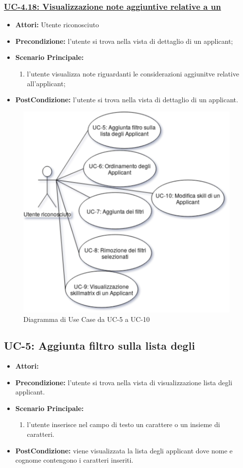 \subsubsection{\underline{UC-4.18: Visualizzazione note aggiuntive relative a un \applicant}}
\begin{itemize}
	\item \textbf{Attori:} Utente riconosciuto
	\item \textbf{Precondizione:} l'utente si trova nella vista di dettaglio di un applicant;
	\item \textbf{Scenario Principale:}
	\begin{enumerate} 
		\item l'utente visualizza note riguardanti le considerazioni aggiunitve relative all'applicant;
	\end{enumerate}
	\item \textbf{PostCondizione:} l'utente si trova nella vista di dettaglio di un applicant.
\end{itemize}

\vspace{0.5em}
\begin{figure}[!h]
	\centering 
	\includegraphics[width=0.7\columnwidth]{immagini/usecase/UC6} 
	\caption{Diagramma di Use Case da UC-5 a UC-10}
	\label{figura:uc-6}
\end{figure}

\subsection{UC-5: Aggiunta filtro sulla lista degli\applicant}
\begin{itemize}
	\item \textbf{Attori:}\loggedusr
	\item \textbf{Precondizione:} l'utente si trova nella vista di visualizzazione lista degli applicant.
	\item \textbf{Scenario Principale:}
	\begin{enumerate}
		\item l'utente inserisce nel campo di testo un carattere o un insieme di caratteri.
	\end{enumerate}
	\item \textbf{PostCondizione:} viene visualizzata la lista degli applicant dove nome e cognome contengono i caratteri inseriti.
\end{itemize}


